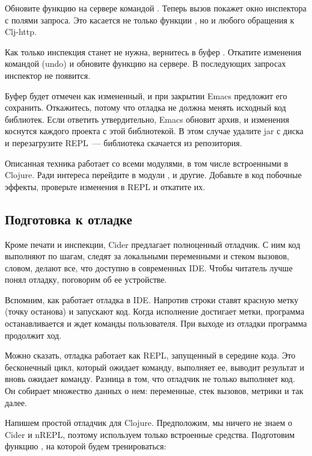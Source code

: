 Обновите функцию на сервере командой . Теперь вызов  покажет окно инспектора с полями запроса. Это касается не только функции , но и любого обращения к Clj-http.

Как только инспекция станет не нужна, вернитесь в буфер . Откатите изменения командой  (undo) и обновите функцию на сервере. В последующих запросах инспектор не появится.


Буфер  будет отмечен как измененный, и при закрытии Emacs предложит его сохранить. Откажитесь, потому что отладка не должна менять исходный код библиотек. Если ответить утвердительно, Emacs обновит архив, и изменения коснутся каждого проекта с этой библиотекой. В этом случае удалите jar с диска и перезагрузите REPL~--- библиотека скачается из репозитория.

Описанная техника работает со всеми модулями, в том числе встроенными в Clojure. Ради интереса перейдите в модули ,  и другие. Добавьте в код побочные эффекты, проверьте изменения в REPL и откатите их.

\subsection{Подготовка к отладке}


Кроме печати и инспекции, Cider предлагает полноценный отладчик. С ним код выполняют по шагам, следят за локальными переменными и стеком вызовов, словом, делают все, что доступно в современных IDE. Чтобы читатель лучше понял отладку, поговорим об ее устройстве.

Вспомним, как работает отладка в IDE. Напротив строки ставят красную метку (точку останова) и запускают код. Когда исполнение достигает метки, программа останавливается и ждет команды пользователя. При выходе из отладки программа продолжит ход.

Можно сказать, отладка работает как REPL, запущенный в середине кода. Это бесконечный цикл, который ожидает команду, выполняет ее, выводит результат и вновь ожидает команду. Разница в том, что отладчик не только выполняет код. Он собирает множество данных о нем: переменные, стек вызовов, метрики и так далее.

Напишем простой отладчик для Clojure. Предположим, мы ничего не знаем о Cider и nREPL, поэтому используем только встроенные средства. Подготовим функцию , на которой будем тренироваться:


